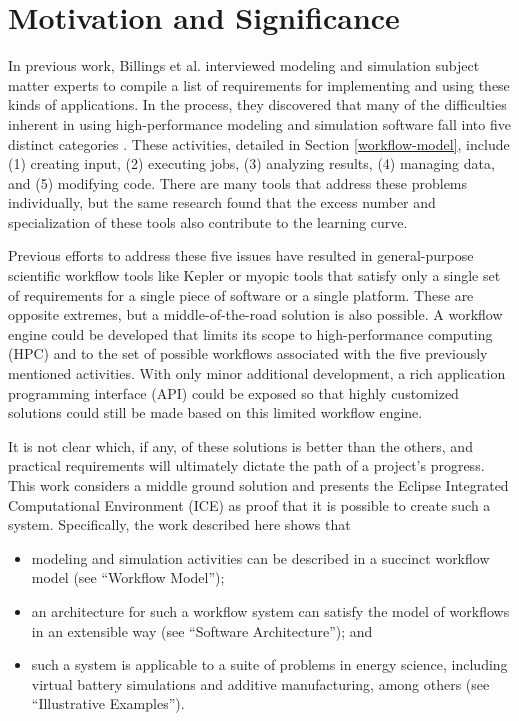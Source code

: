 \section{Motivation and Significance}\label{motivation-and-significance}

In previous work, Billings et al. interviewed modeling and simulation subject matter experts to compile a list of requirements for implementing and 
using these kinds of applications. In the process, they discovered 
that many of the difficulties inherent in using
high-performance modeling and simulation software fall into five
distinct categories \cite{billings_designing_2009}. These activities,
detailed in Section \ref{workflow-model}, include (1) creating input,
(2) executing jobs, (3) analyzing results, (4) managing data, and (5)
modifying code. There are many tools that address these problems
individually, but the same research found that the excess number and
specialization of these tools also contribute to the learning curve.

Previous efforts to address these five issues have resulted in general-purpose scientific workflow tools like Kepler \cite{ludascher_scientific_2006} 
or myopic tools that satisfy only a single
set of requirements for a single piece of software or a single platform. These
are opposite extremes, but a middle-of-the-road solution is also
possible. A workflow engine could be developed that limits its scope to
high-performance computing (HPC) and to the set of possible workflows
associated with the five previously mentioned activities. With only
minor additional development, a rich application programming interface
(API) could be exposed so that highly customized solutions could still
be made based on this limited workflow engine.

It is not clear which, if any, of these solutions is better than the
others, and practical requirements will ultimately dictate the path of a
project's progress. This work considers a middle ground solution and
presents the Eclipse Integrated Computational Environment (ICE) as proof
that it is possible to create such a system. Specifically, the work
described here shows that

\begin{itemize}
\item
  modeling and simulation activities can be described in a succinct
  workflow model (see ``Workflow Model'');
\item
  an architecture for such a workflow system can satisfy the model of
  workflows in an extensible way (see ``Software Architecture''); and 
\item
  such a system is applicable to a suite of problems in energy science,
  including virtual battery simulations and additive manufacturing, 
  among others (see ``Illustrative Examples'').
\end{itemize}

